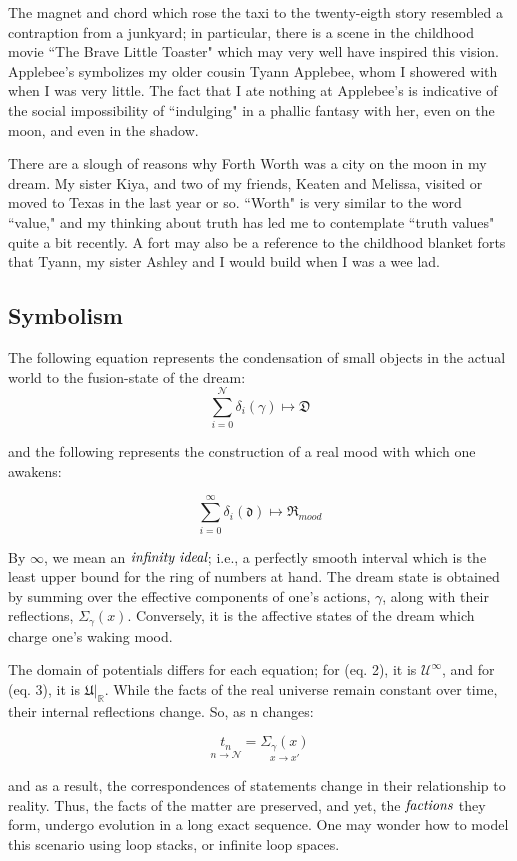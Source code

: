 \documentclass{article}
\begin{document}
The magnet and chord which rose the taxi to the twenty-eigth story resembled a contraption from a junkyard; in particular, there is a scene in the childhood movie ``The Brave Little Toaster" which may very well have inspired this vision. Applebee's symbolizes my older cousin Tyann Applebee, whom I showered with when I was very little. The fact that I ate nothing at Applebee's is indicative of the social impossibility of ``indulging" in a phallic fantasy with her, even on the moon, and even in the shadow.

There are a slough of reasons why Forth Worth was a city on the moon in my dream. My sister Kiya, and two of my friends, Keaten and Melissa, visited or moved to Texas in the last year or so. ``Worth" is very similar to the word ``value," and my thinking about truth has led me to contemplate ``truth values" quite a bit recently. A fort may also be a reference to the childhood blanket forts that Tyann, my sister Ashley and I would build when I was a wee lad.

\subsection{Symbolism}
The following equation represents the condensation of small objects in the actual world to the fusion-state of the dream:
\begin{equation}
	\sum_{i=0}^{\mathcal{N}} \delta_i(\gamma) \mapsto \mathfrak{D}
\end{equation}

and the following represents the construction of a real mood with which one awakens:

\begin{equation}
	\sum_{i=0}^{\infty} \delta_i(\mathfrak{d}) \mapsto \mathfrak{R}_{mood}
\end{equation}

By $\infty$, we mean an $\emph{infinity ideal}$; i.e., a perfectly smooth interval which is the least upper bound for the ring of numbers at hand. The dream state is obtained by summing over the effective components of one's actions, $\gamma$, along with their reflections, $\Sigma_\gamma(x)$. Conversely, it is the affective states of the dream which charge one's waking mood. 

The domain of potentials differs for each equation; for (eq. 2), it is $\mathcal{U}^\infty$, and for (eq. 3), it is $\mathfrak{U}|_\mathbb{R}$. While the facts of the real universe remain constant over time, their internal reflections change. So, as n changes:

\begin{equation}
	\underset{n\to\mathcal{N}}{t_n} = \underset{x \to x'}{\Sigma_\gamma(x)}
\end{equation}

and as a result, the correspondences of statements change in their relationship to reality. Thus, the facts of the matter are preserved, and yet, the $\emph{factions}$ they form, undergo evolution in a long exact sequence. One may wonder how to model this scenario using loop stacks, or infinite loop spaces.
\end{document}
